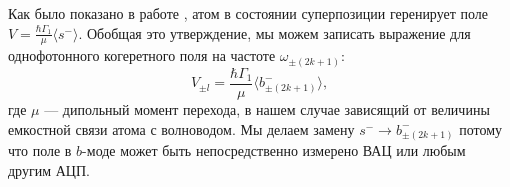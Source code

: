 
Как было показано в работе \cite{Astafiev2010resonance}, атом в состоянии суперпозиции геренирует поле $V = \frac{\hbar\Gamma_1}{\mu}\langle s^-\rangle$. Обобщая это утверждение, мы можем записать выражение для однофотонного когеретного поля на частоте $\omega_{\pm (2k+1)}$:
\begin{equation}
	V_{\pm l} = \frac{\hbar\Gamma_1}{\mu}\langle b^-_{\pm (2k+1)}\rangle,
	\label{Vl}
\end{equation}
где $\mu$ --- дипольный момент перехода, в нашем случае зависящий от величины емкостной связи атома с волноводом. Мы делаем замену $s^- \rightarrow b^-_{\pm (2k+1)}$ потому что поле в $b$-моде может быть непосредственно измерено ВАЦ или любым другим АЦП.

